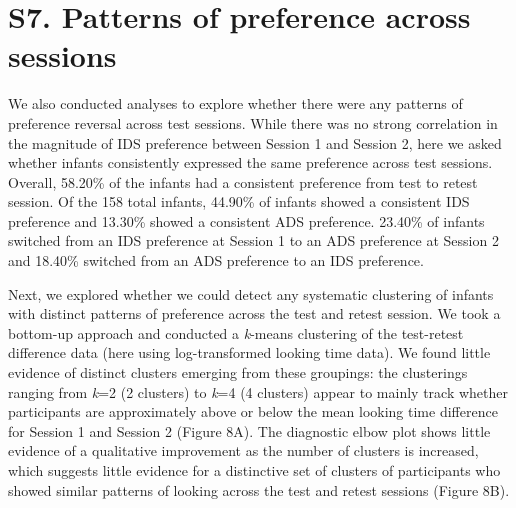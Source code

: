\documentclass[
  english,
  man, donotrepeattitle,floatsintext]{apa6}
\begin{document}
\newpage

\hypertarget{s7.-patterns-of-preference-across-sessions}{%
\section{S7. Patterns of preference across sessions}\label{s7.-patterns-of-preference-across-sessions}}

We also conducted analyses to explore whether there were any patterns of preference reversal across test sessions.
While there was no strong correlation in the magnitude of IDS preference between Session 1 and Session 2, here we asked whether infants consistently expressed the same preference across test sessions.
Overall, 58.20\% of the infants had a consistent preference from test to retest session.
Of the 158 total infants, 44.90\% of infants showed a consistent IDS preference and 13.30\% showed a consistent ADS preference.
23.40\% of infants switched from an IDS preference at Session 1 to an ADS preference at Session 2 and 18.40\% switched from an ADS preference to an IDS preference.

Next, we explored whether we could detect any systematic clustering of infants with distinct patterns of preference across the test and retest session.
We took a bottom-up approach and conducted a \emph{k}-means clustering of the test-retest difference data (here using log-transformed looking time data).
We found little evidence of distinct clusters emerging from these groupings: the clusterings ranging from \emph{k}=2 (2 clusters) to \emph{k}=4 (4 clusters) appear to mainly track whether participants are approximately above or below the mean looking time difference for Session 1 and Session 2 (Figure 8A).
The diagnostic elbow plot shows little evidence of a qualitative improvement as the number of clusters is increased, which suggests little evidence for a distinctive set of clusters of participants who showed similar patterns of looking across the test and retest sessions (Figure 8B).
\end{document}
